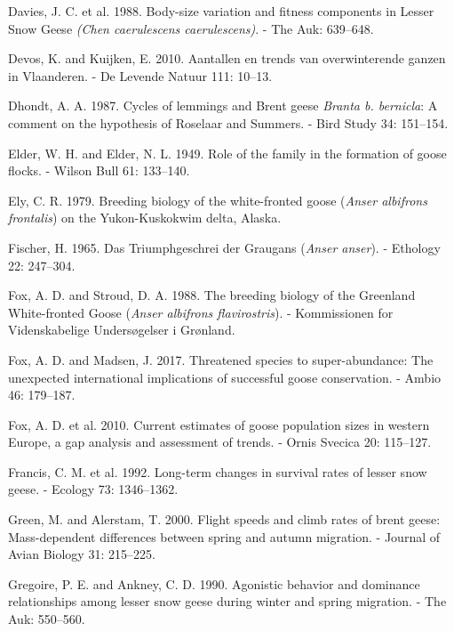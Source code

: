\documentclass[10pt,twocolumn]{paper}
\begin{document}
\hypertarget{ref-davies1988body}{}
Davies, J. C. et al. 1988. Body-size variation and fitness components in
Lesser Snow Geese \emph{(Chen caerulescens caerulescens)}. - The Auk:
639--648.

\hypertarget{ref-devos2010aantallen}{}
Devos, K. and Kuijken, E. 2010. Aantallen en trends van overwinterende
ganzen in Vlaanderen. - De Levende Natuur 111: 10--13.

\hypertarget{ref-dhondt1987cycles}{}
Dhondt, A. A. 1987. Cycles of lemmings and Brent geese \emph{Branta b.
bernicla}: A comment on the hypothesis of Roselaar and Summers. - Bird
Study 34: 151--154.

\hypertarget{ref-elder1949role}{}
Elder, W. H. and Elder, N. L. 1949. Role of the family in the formation
of goose flocks. - Wilson Bull 61: 133--140.

\hypertarget{ref-ely1979breeding}{}
Ely, C. R. 1979. Breeding biology of the white-fronted goose
(\emph{Anser albifrons frontalis}) on the Yukon-Kuskokwim delta, Alaska.

\hypertarget{ref-fischer1965triumphgeschrei}{}
Fischer, H. 1965. Das Triumphgeschrei der Graugans (\emph{Anser anser}).
- Ethology 22: 247--304.

\hypertarget{ref-fox1988breeding}{}
Fox, A. D. and Stroud, D. A. 1988. The breeding biology of the Greenland
White-fronted Goose (\emph{Anser albifrons flavirostris}). -
Kommissionen for Videnskabelige Undersøgelser i Grønland.

\hypertarget{ref-Fox2017a}{}
Fox, A. D. and Madsen, J. 2017. Threatened species to super-abundance:
The unexpected international implications of successful goose
conservation. - Ambio 46: 179--187.

\hypertarget{ref-fox2010current}{}
Fox, A. D. et al. 2010. Current estimates of goose population sizes in
western Europe, a gap analysis and assessment of trends. - Ornis Svecica
20: 115--127.

\hypertarget{ref-francis1992survival}{}
Francis, C. M. et al. 1992. Long-term changes in survival rates of
lesser snow geese. - Ecology 73: 1346--1362.

\hypertarget{ref-JAV:JAV310213}{}
Green, M. and Alerstam, T. 2000. Flight speeds and climb rates of brent
geese: Mass-dependent differences between spring and autumn migration. -
Journal of Avian Biology 31: 215--225.

\hypertarget{ref-gregoire1990agonistic}{}
Gregoire, P. E. and Ankney, C. D. 1990. Agonistic behavior and dominance
relationships among lesser snow geese during winter and spring
migration. - The Auk: 550--560.
\end{document}
